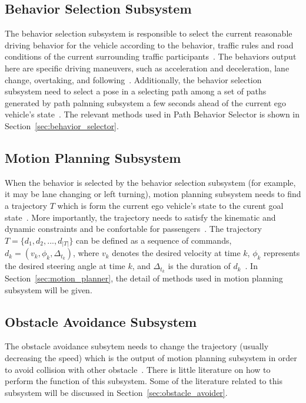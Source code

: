 \documentclass[conference]{IEEEtran}
\begin{document}
\subsection{Behavior Selection Subsystem}
The behavior selection subsystem is responsible to select the current reasonable driving behavior for the vehicle according to the behavior, traffic rules and road conditions of the current surrounding traffic participants~\cite{Brian2016}. The behaviors output here are specific driving maneuvers, such as acceleration and deceleration, lane change, overtaking, and following~\cite{Brian2016}. Additionally, the behavior selection subsystem need to select a pose in a selecting path among a set of paths generated by path palnning subsystem a few seconds ahead of the current ego vehicle's state~\cite{self_driving}. The relevant methods used in Path Behavior Selector is shown in Section~\ref{sec:behavior_selector}.

\subsection{Motion Planning Subsystem}
When the behavior is selected by the behavior selection subsystem (for example, it may be lane changing or left turning), motion planning subsystem needs to find a trajectory $T$ which is form the current ego vehicle's state to the curent goal state~\cite{Brian2016}. More importantly, the trajectory needs to satisfy the kinematic and dynamic constraints and be confortable for passengers~\cite{self_driving}. The trajectory $T=\{d_1, d_2, ..., d_{|T|}\}$ can be defined as a sequence of commands, $d_k=(v_k, \phi_k, \Delta_{t_k})$, where $v_k$ denotes the desired velocity at time $k$, $\phi_k$ represents the desired steering angle at time $k$, and $\Delta_{t_k}$ is the duration of $d_k$~\cite{self_driving}. In Section~\ref{sec:motion_planner}, the detail of methods used in motion planning subsystem will be given.

\subsection{Obstacle Avoidance Subsystem}
The obstacle avoidance subsytem needs to change the trajectory (usually decreasing the speed) which is the output of motion planning subsystem in order to avoid collision with other obstacle~\cite{self_driving}.  There is little literature on how to perform the function of this subsystem. Some of the literature related to this subsystem will be discussed in Section~\ref{sec:obstacle_avoider}.
\end{document}
